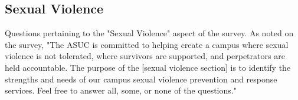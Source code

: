 \documentclass{article}\usepackage[]{graphicx}\usepackage[]{color}
\makeatletter
\newenvironment{kframe}{%
 \def\at@end@of@kframe{}%
 \ifinner\ifhmode%
  \def\at@end@of@kframe{\end{minipage}}%
  \begin{minipage}{\columnwidth}%
 \fi\fi%
 \def\FrameCommand##1{\hskip\@totalleftmargin \hskip-\fboxsep
 \colorbox{shadecolor}{##1}\hskip-\fboxsep
     \hskip-\linewidth \hskip-\@totalleftmargin \hskip\columnwidth}%
 \MakeFramed {\advance\hsize-\width
   \@totalleftmargin\z@ \linewidth\hsize
   \@setminipage}}%
 {\par\unskip\endMakeFramed%
 \at@end@of@kframe}
\makeatother
\begin{document}
\begin{kframe}

{\ttfamily\noindent\bfseries{}}\end{kframe}

\newpage
\subsection{Sexual Violence}
Questions pertaining to the "Sexual Violence" aspect of the survey. As noted on the survey, "The ASUC is committed to helping create a campus where sexual violence is not
tolerated, where survivors are supported, and perpetrators are held accountable.
The purpose of the [sexual violence section] is to identify the strengths and needs of our campus
sexual violence prevention and response services. Feel free to answer all, some,
or none of the questions."
\begin{kframe}


{\ttfamily\noindent\bfseries{}}\end{kframe}%
\end{document}
